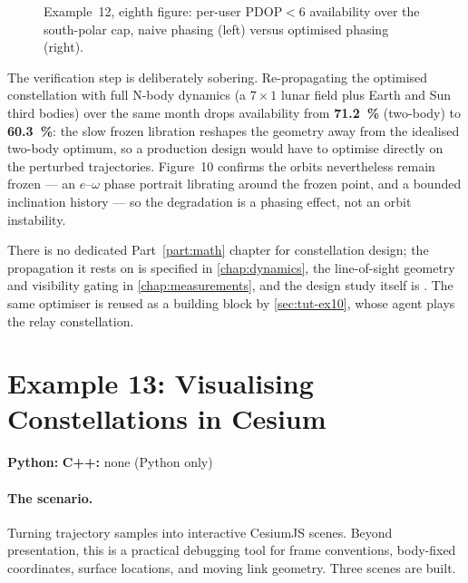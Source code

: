 \begin{figure}[htbp]
  \centering
  \caption{Example~12, eighth figure: per-user $\mathrm{PDOP}<6$ availability
           over the south-polar cap, naive phasing (left) versus optimised
           phasing (right).}
  \label{fig:tut-ex12-avail}
\end{figure}

The verification step is deliberately sobering. Re-propagating the optimised
constellation with full N-body dynamics (a $7\times1$ lunar field plus Earth and
Sun third bodies) over the same month drops availability from
\textbf{\SI{71.2}{\percent}} (two-body) to \textbf{\SI{60.3}{\percent}}: the slow
frozen libration reshapes the geometry away from the idealised two-body optimum,
so a production design would have to optimise directly on the perturbed
trajectories. Figure~10 confirms the orbits nevertheless remain frozen --- an
$e$--$\omega$ phase portrait librating around the frozen point, and a bounded
inclination history --- so the degradation is a phasing effect, not an orbit
instability.

There is no dedicated Part~\ref{part:math} chapter for constellation design; the
propagation it rests on is specified in \cref{chap:dynamics}, the line-of-sight
geometry and visibility gating in \cref{chap:measurements}, and the design study
itself is \citep{iiyama2025constellation}. The same optimiser is reused as a
building block by \cref{sec:tut-ex10}, whose  agent
plays the relay constellation.

\section{Example 13: Visualising Constellations in Cesium}
\label{sec:tut-ex13}

\textbf{Python:}  \quad
\textbf{C++:} none (Python only)

\paragraph{The scenario.}
Turning \lupnt{} trajectory samples into interactive CesiumJS scenes. Beyond
presentation, this is a practical debugging tool for frame conventions,
body-fixed coordinates, surface locations, and moving link geometry. Three
scenes are built.

